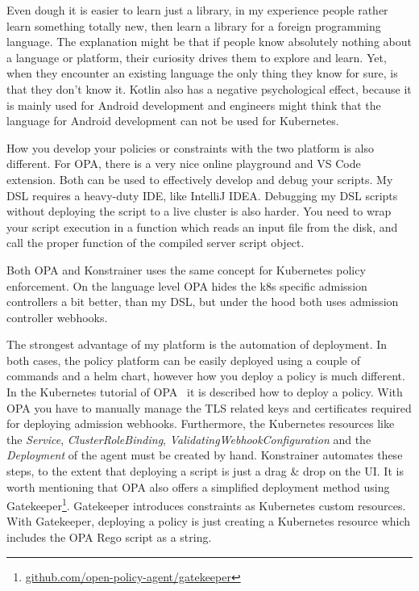 Even dough it is easier to learn just a library, in my experience people rather learn something totally new, then learn a library for a foreign programming language. The explanation might be that if people know absolutely nothing about a language or platform, their curiosity drives them to explore and learn. Yet, when they encounter an existing language the only thing they know for sure, is that they don't know it. Kotlin also has a negative psychological effect, because it is mainly used for Android development and engineers might think that the language for Android development can not be used for Kubernetes.

How you develop your policies or constraints with the two platform is also different. For OPA, there is a very nice online playground and VS Code extension. Both can be used to effectively develop and debug your scripts. My DSL requires a heavy-duty IDE, like IntelliJ IDEA. Debugging my DSL scripts without deploying the script to a live cluster is also harder. You need to wrap your script execution in a function which reads an input file from the disk, and call the proper function of the compiled server script object.

Both OPA and Konstrainer uses the same concept for Kubernetes policy enforcement. On the language level OPA hides the k8s specific admission controllers a bit better, than my DSL, but under the hood both uses admission controller webhooks.

The strongest advantage of my platform is the automation of deployment. In both cases, the policy platform can be easily deployed using a couple of commands and a helm chart, however how you deploy a policy is much different. In the Kubernetes tutorial of OPA~\cite{OPA} it is described how to deploy a policy. With OPA you have to manually manage the TLS related keys and certificates required for deploying admission webhooks. Furthermore, the Kubernetes resources like the \emph{Service}, \emph{ClusterRoleBinding}, \emph{ValidatingWebhookConfiguration} and the \emph{Deployment} of the agent must be created by hand. Konstrainer automates these steps, to the extent that deploying a script is just a drag \& drop on the UI. It is worth mentioning that OPA also offers a simplified deployment method using Gatekeeper\footnote{\url{github.com/open-policy-agent/gatekeeper}}. Gatekeeper introduces constraints as Kubernetes custom resources. With Gatekeeper, deploying a policy is just creating a Kubernetes resource which includes the OPA Rego script as a string.

